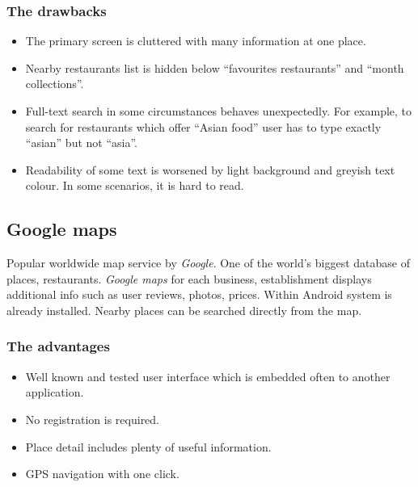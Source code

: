 \subsubsection{The drawbacks}
\begin{itemize}
    \item The primary screen is cluttered with many information at one place.
    \item Nearby restaurants list is hidden below ``favourites restaurants'' and ``month collections''.
    \item Full-text search in some circumstances behaves unexpectedly. For example, to search for restaurants which offer ``Asian food'' user has to type exactly ``asian'' but not ``asia''.
    \item Readability of some text is worsened by light background and greyish text colour. In some scenarios, it is hard to read.
\end{itemize}

\subsection{Google maps}
Popular worldwide map service by \textit{Google}. One of the world's biggest database of places, restaurants. 
\textit{Google maps} for each business, establishment displays additional info such as user reviews, photos, prices. 
Within Android system is already installed. Nearby places can be searched directly from the map.


\subsubsection{The advantages}
\begin{itemize}
    \item Well known and tested user interface which is embedded often to another application.
    \item No registration is required.
    \item Place detail includes plenty of useful information.
    \item GPS navigation with one click.
\end{itemize}

